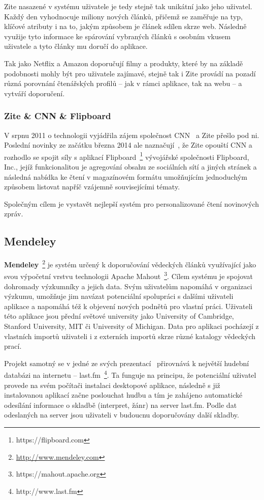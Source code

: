 \documentclass[thesis=M,czech]{FITthesis}[2014/05/07]
\begin{document}
Zite nasazené v systému uživatele je tedy stejně tak unikátní jako jeho uživatel. Každý den vyhodnocuje miliony nových článků, přičemž se zaměřuje na typ, klíčové atributy i na to, jakým způsobem je článek sdílen skrze web. Následně využije tyto informace ke spárování vybraných článků s osobním vkusem uživatele a tyto články mu doručí do aplikace. 

Tak jako Netflix a Amazon doporučují filmy a produkty, které by na základě podobnosti mohly být pro uživatele zajímavé, stejně tak i Zite provádí na pozadí různá porovnání čtenářských profilů – jak v rámci aplikace, tak na webu – a vytváří doporučení.

\subsubsection{Zite \& CNN \& Flipboard}
V srpnu 2011 o technologii vyjádřila zájem společnost CNN~\cite{zitecnn} a Zite přešlo pod ni. Poslední novinky ze začátku března 2014 ale naznačují~\cite{ziteflip}, že Zite opouští CNN a rozhodlo se spojit síly s aplikací Flipboard~\footnote{https://flipboard.com} vývojářské společnosti Flipboard, Inc., jejíž funkcionalitou je agregování obsahu ze sociálních sítí a jiných stránek a následná nabídka ke čtení v magazínovém formátu umožňujícím jednoduchým způsobem listovat napříč vzájemně souvisejícími tématy.

Společným cílem je vystavět nejlepší systém pro personalizované čtení novinových zpráv. 

\subsection{Mendeley}	

\textbf{Mendeley}~\footnote{\url{http://www.mendeley.com}} je systém určený k doporučování vědeckých článků využívající jako svou výpočetní vrstvu technologii Apache Mahout~\footnote{https://mahout.apache.org}. Cílem systému je spojovat dohromady výzkumníky a jejich data. Svým uživatelům napomáhá v organizaci výzkumu, umožňuje jim navázat potenciální spolupráci s dalšími uživateli aplikace a napomáhá též k objevení nových podnětů pro vlastní práci. Uživateli této aplikace jsou přední světové university jako University of Cambridge, Stanford University, MIT či University of Michigan. Data pro aplikaci pocházejí z vlastních importů uživateli i z externích importů skrze různé katalogy vědeckých prací. 

Projekt samotný se v jedné ze svých prezentací~\cite{mendeleylastfm} přirovnává k největší hudební databázi na internetu – last.fm~\footnote{http://www.last.fm}. Ta funguje na principu, že potenciální uživatel provede na svém počítači instalaci desktopové aplikace, následně s již instalovanou aplikací začne poslouchat hudbu a tím je zahájeno automatické odesílání informace o skladbě (interpret, žánr) na server last.fm. Podle dat odeslaných na server jsou uživateli v budoucnu doporučovány další skladby. 
\end{document}

